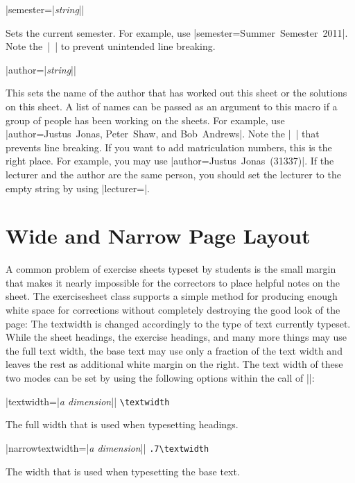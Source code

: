 \documentclass[a4paper,fleqn]{report}
\def\exercisesheet{{exercisesheet}}
\def\syntaxdefaultarg#1{\hfill\texttt{\small #1}\par\smallskip\noindent\ignorespaces}
\def\metaargument#1{\textit{\small #1}}
\begin{document}
\begin{syntax}
  |semester={|\metaargument{string}|}| \syntaxdefaultarg{}
  Sets the current semester. For example, use 
  |semester={Summer~Semester~2011}|. Note the~|~| to prevent
  unintended line breaking.
\end{syntax}

\begin{syntax}
  |author={|\metaargument{string}|}| \syntaxdefaultarg{}
  This sets the name of the author that has worked out this sheet or
  the solutions on this sheet. A list of names can be passed as an
  argument to this macro if a group of people has been working on the
  sheets. For example, use 
  |author={Justus~Jonas, Peter~Shaw, and Bob~Andrews}|. 
  Note the |~| that prevents line breaking. If you want
  to add matriculation numbers, this is the right place. For example,
  you may use |author={Justus~Jonas~(31337)}|. If the lecturer and the
  author are the same person, you should set the lecturer to the empty
  string by using |lecturer={}|.
\end{syntax}


\section{Wide and Narrow Page Layout}

A common problem of exercise sheets typeset by students is the small
margin that makes it nearly impossible for the correctors to place
helpful notes on the sheet. The \exercisesheet{} class supports a
simple method for producing enough white space for corrections without
completely destroying the good look of the page: The textwidth is
changed accordingly to the type of text currently typeset. While the
sheet headings, the exercise headings, and many more things may use
the full text width, the base text may use only a fraction of the text
width and leaves the rest as additional white margin on the right. The
text width of these two modes can be set by using the following
options within the call of |\sheetconf|:

\begin{syntax}
  |textwidth={|\metaargument{a dimension}|}|
  \syntaxdefaultarg{\textbackslash textwidth}
  The full width that is used when typesetting headings.
\end{syntax}

\begin{syntax}
  |narrowtextwidth={|\metaargument{a dimension}|}|
  \syntaxdefaultarg{.7\textbackslash textwidth}
  The width that is used when typesetting the base text.
\end{syntax}
\end{document}

